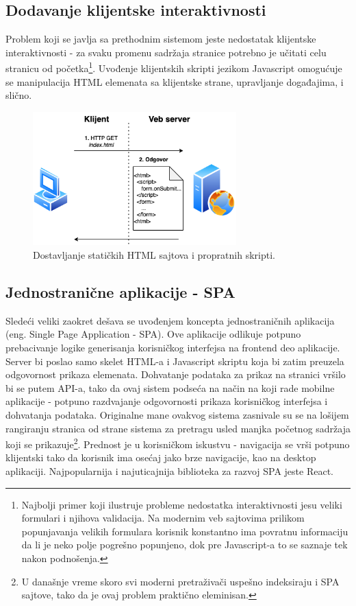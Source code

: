 \documentclass[12pt,oneside]{memoir}
\begin{document}
\subsection{Dodavanje klijentske interaktivnosti}

Problem koji se javlja sa prethodnim sistemom jeste nedostatak klijentske interaktivnosti - za svaku promenu sadržaja stranice potrebno je učitati celu stranicu od početka\footnote{Najbolji primer koji ilustruje probleme nedostatka interaktivnosti jesu veliki formulari i njihova validacija. Na modernim veb sajtovima prilikom popunjavanja velikih formulara korisnik konstantno ima povratnu informaciju da li je neko polje pogrešno popunjeno, dok pre Javascript-a to se saznaje tek nakon podnošenja.}. Uvođenje klijentskih skripti jezikom Javascript omogućuje se manipulacija HTML elemenata sa klijentske strane, upravljanje događajima, i slično.

\begin{figure}[h]
  \centering
  \includegraphics[width=0.7\textwidth]{docs/images/ch_4/frontend-dev-phase1.png} 
  \caption{Dostavljanje statičkih HTML sajtova i propratnih skripti.}
  \label{fig:sample}
\end{figure}

\newpage
\subsection{Jednostranične aplikacije - SPA}

Sledeći veliki zaokret dešava se uvođenjem koncepta jednostraničnih aplikacija (eng. Single Page Application - SPA). Ove aplikacije odlikuje potpuno prebacivanje logike generisanja korisničkog interfejsa na frontend deo aplikacije. Server bi poslao samo skelet HTML-a i Javascript skriptu koja bi zatim preuzela odgovornost prikaza elemenata. Dohvatanje podataka za prikaz na stranici vršilo bi se putem API-a, tako da ovaj sistem podseća na način na koji rade mobilne aplikacije - potpuno razdvajanje odgovornosti prikaza korisničkog interfejsa i dohvatanja podataka. Originalne mane ovakvog sistema zasnivale su se na lošijem rangiranju stranica od strane sistema za pretragu usled manjka početnog sadržaja koji se prikazuje\footnote{U današnje vreme skoro svi moderni pretraživači uspešno indeksiraju i SPA sajtove, tako da je ovaj problem praktično eleminisan.}. Prednost je u korisničkom iskustvu - navigacija se vrši potpuno klijentski tako da korisnik ima osećaj jako brze navigacije, kao na desktop aplikaciji. Najpopularnija i najuticajnija biblioteka za razvoj SPA jeste React.
\end{document}
